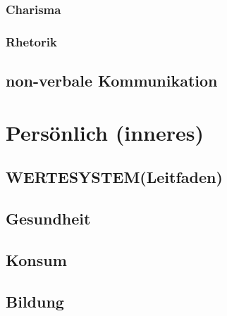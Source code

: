         \section{Charisma}
        \section{Rhetorik}
    \chapter{non-verbale Kommunikation}

\part{Persönlich (inneres)} 
    \chapter{WERTESYSTEM(Leitfaden)}
    \chapter{Gesundheit}
    \chapter{Konsum}
    \chapter{Bildung}

